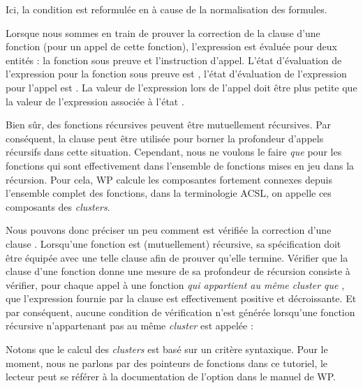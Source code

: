 

Ici, la condition  est reformulée en
 à cause de la normalisation des formules.


Lorsque nous sommes en train de prouver la correction de la clause
 d'une fonction (pour un appel de cette fonction),
l'expression est évaluée pour deux entités : la fonction sous preuve et
l'instruction d'appel. L'état d'évaluation de l'expression pour la fonction
sous preuve est , l'état d'évaluation de l'expression pour
l'appel est . La valeur de l'expression lors de l'appel doit
être plus petite que la valeur de l'expression associée à l'état .




Bien sûr, des fonctions récursives peuvent être mutuellement récursives. Par
conséquent, la clause  peut être utilisée pour borner la
profondeur d'appels récursifs dans cette situation. Cependant, nous ne voulons
le faire \textit{que} pour les fonctions qui sont effectivement dans l'ensemble de
fonctions mises en jeu dans la récursion. Pour cela, WP calcule les composantes
fortement connexes depuis l'ensemble complet des fonctions, dans la terminologie
ACSL, on appelle ces composants des \textit{clusters}.


Nous pouvons donc préciser un peu comment est vérifiée la correction d'une clause
. Lorsqu'une fonction est (mutuellement) récursive, sa
spécification doit être équipée avec une telle clause afin de prouver qu'elle
termine. Vérifier que la clause  d'une fonction
 donne une mesure de sa profondeur de récursion consiste à vérifier,
pour chaque appel à une fonction \textit{qui appartient au même cluster que
}, que l'expression fournie par la clause est effectivement positive
et décroissante. Et par conséquent, aucune condition de vérification n'est
générée lorsqu'une fonction récursive n'appartenant pas au même \textit{cluster}
est appelée :




\begin{Information}
  Notons que le calcul des \textit{clusters} est basé sur un critère syntaxique.
  Pour le moment, nous ne parlons par des pointeurs de fonctions dans ce tutoriel,
  le lecteur peut se référer à la documentation de l'option
   dans le manuel de WP.
\end{Information}


